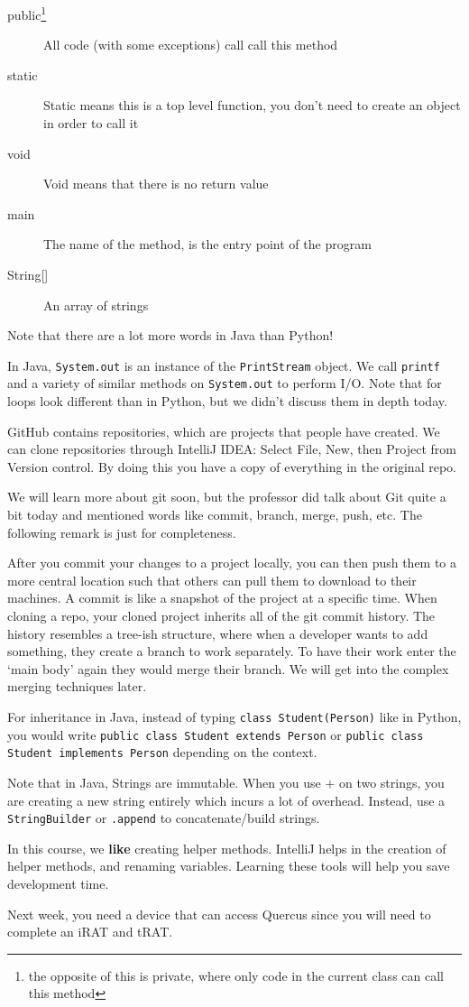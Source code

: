 \begin{description}
    \item[public\footnote{the opposite of this is private, where only code in the current class can call this method}] All code (with some exceptions) call call this method
    \item[static] Static means this is a top level function, you don't need to create an object in order to call it
    \item[void] Void means that there is no return value
    \item[main] The name of the method, is the entry point of the program
    \item[String{[]}] An array of strings
\end{description}

Note that there are a lot more words in Java than Python!

In Java, \texttt{System.out} is an instance of the \texttt{PrintStream} object. We call \texttt{printf} and a variety of similar methods on \texttt{System.out} to perform I/O. Note that for loops look different than in Python, but we didn't discuss them in depth today.

GitHub contains repositories, which are projects that people have created. We can clone repositories through IntelliJ IDEA: Select File, New, then Project from Version control. By doing this you have a copy of everything in the original repo.

We will learn more about git soon, but the professor did talk about Git quite a bit today and mentioned words like commit, branch, merge, push, etc. The following remark is just for completeness.

\begin{remark}[On Git]
After you commit your changes to a project locally, you can then push them to a more central location such that others can pull them to download to their machines. A commit is like a snapshot of the project at a specific time. When cloning a repo, your cloned project inherits all of the git commit history. The history resembles a tree-ish structure, where when a developer wants to add something, they create a branch to work separately. To have their work enter the `main body' again they would merge their branch. We will get into the complex merging techniques later.
\end{remark}

For inheritance in Java, instead of typing \texttt{class Student(Person)} like in Python, you would write \texttt{public class Student extends Person} or \texttt{public class Student implements Person} depending on the context.

Note that in Java, Strings are immutable. When you use $+$ on two strings, you are creating a new string entirely which incurs a lot of overhead. Instead, use a \texttt{StringBuilder} or \texttt{.append} to concatenate/build strings.

In this course, we \textbf{like} creating helper methods. IntelliJ helps in the creation of helper methods, and renaming variables. Learning these tools will help you save development time.

Next week, you need a device that can access Quercus since you will need to complete an iRAT and tRAT.
